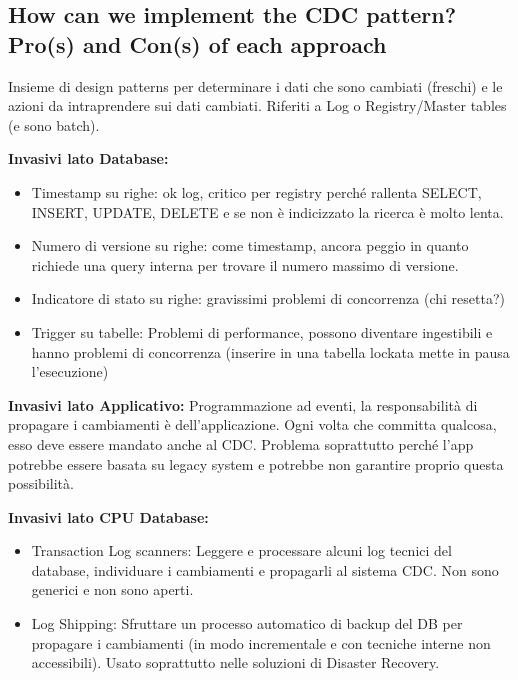 \documentclass{article}
\begin{document}
\subsection{How can we implement the CDC pattern? Pro(s) and Con(s) of each approach}
Insieme di design patterns per determinare i dati che sono cambiati (freschi) e le azioni da intraprendere sui dati cambiati. Riferiti a Log o Registry/Master tables (e sono batch).

\textbf{Invasivi lato Database:}
\begin{itemize}
    \item Timestamp su righe: ok log, critico per registry perché rallenta SELECT, INSERT, UPDATE, DELETE e se non è indicizzato la ricerca è molto lenta.
    \item Numero di versione su righe: come timestamp, ancora peggio in quanto richiede una query interna per trovare il numero massimo di versione.
    \item Indicatore di stato su righe: gravissimi problemi di concorrenza (chi resetta?)
    \item Trigger su tabelle: Problemi di performance, possono diventare ingestibili e hanno problemi di concorrenza (inserire in una tabella lockata mette in pausa l’esecuzione)
\end{itemize}

\textbf{Invasivi lato Applicativo:} Programmazione ad eventi, la responsabilità di propagare i cambiamenti è dell'applicazione. Ogni volta che committa qualcosa, esso deve essere mandato anche al CDC. Problema soprattutto perché l'app potrebbe essere basata su legacy system e potrebbe non garantire proprio questa possibilità.

\textbf{Invasivi lato CPU Database:}
\begin{itemize}
    \item Transaction Log scanners: Leggere e processare alcuni log tecnici del database, individuare i cambiamenti e propagarli al sistema CDC. Non sono generici e non sono aperti.
    \item Log Shipping: Sfruttare un processo automatico di backup del DB per propagare i cambiamenti (in modo incrementale e con tecniche interne non accessibili). Usato soprattutto nelle soluzioni di Disaster Recovery.
\end{itemize}
\end{document}
